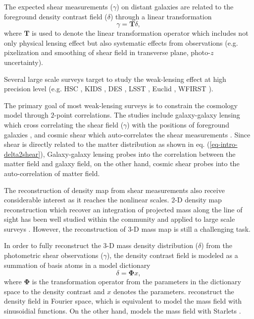 \documentclass[twocolumn]{aastex62}
\begin{document}
The expected shear measurements ($\gamma$) on distant galaxies are related to the
foreground density contrast field ($\delta$) through a linear transformation
\begin{equation} \label{eq-intro-delta2shear}
 \gamma=\mathbf{T} \delta,
\end{equation}
where $\mathbf{T}$ is used to denote the linear transformation operator which includes not only physical lensing effect
but also systematic effects from observations (e.g. pixelization and smoothing of shear field in
transverse plane, photo-$z$ uncertainty).

Several large scale surveys target to study the weak-lensing effect at high precision level (e.g. HSC \citep{HSC1-data}, KIDS
\citep{KIDS13}, DES \citep{DES05}, LSST \citep{LSSTScienceBook}, Euclid \citep{Euclid2011}, WFIRST \citep{WFIRST15}).

The primary goal of most weak-lensing surveys is to constrain the cosmology model through $2$-point correlations. The studies
include galaxy-galaxy lensing which cross correlating the shear field ($\gamma$) with the positions of foreground galaxies
\citep{gglens-GAMA-Han2014,gglens-BossCFHTMore2015,gglens-DES1},
and cosmic shear which auto-correlates the shear measurements
\citep{cosmicShearRealKids450,cosmicShear-DES1,cosmicShear_HSC1_Chiaki2019,cosmicShear_HSC1_Hamana2019}.
Since shear is directly related to the matter distribution as shown in eq. (\ref{eq-intro-delta2shear}), Galaxy-galaxy lensing
probes into the correlation between the matter field and galaxy field, on the other hand, cosmic shear probes into the
auto-correlation of matter field.

The reconstruction of density map from shear measurements also receive considerable interest as it reaches the nonlinear scales.
$2$-D density map reconstruction which recover an integration of projected mass along the line of sight has been well studied
within the community \citep{massMap-KS1993,WL-massMap-Glimpse2D-Lanusse2016,sparseBaysianMassMap-Price2020}
and applied to large scale surveys \citep{HSC1-massMaps,massMapDES-Chang2018,DES-SV-massMap-sparsity}. However, the
reconstruction of $3$-D mass map is still a challenging task.

In order to fully reconstruct the $3$-D mass density distribution ($\delta$) from the photometric shear observations ($\gamma$),
the density contrast field is modeled as a summation of basis atoms in a model dictionary
\begin{equation} \label{eq-intro-dict}
 \delta= \mathbf{\Phi} x,
\end{equation}
where $\mathbf{\Phi}$ is the transformation operator from the parameters in the dictionary space to the density contrast
and $x$ denotes the parameters. \citet{LSS-massMap-Wiener-Simon2009} reconstruct the density field
in Fourier space, which is equivalent to model the mass field with sinusoidial functions. On the other hand,
\citet{LSS-massMap-Glimpse3D-Leonard2014} models the mass field with Starlets \citep{Starlet-Starck2015}.
\end{document}
